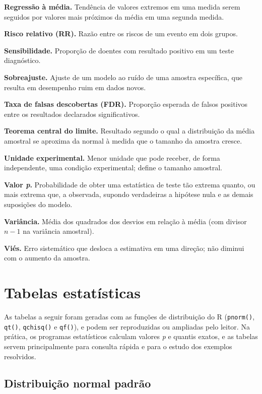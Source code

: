 \documentclass[
]{book}
\begin{document}
\textbf{Regressão à média.} Tendência de valores extremos em uma medida serem seguidos por valores mais próximos da média em uma segunda medida.

\textbf{Risco relativo (RR).} Razão entre os riscos de um evento em dois grupos.

\textbf{Sensibilidade.} Proporção de doentes com resultado positivo em um teste diagnóstico.

\textbf{Sobreajuste.} Ajuste de um modelo ao ruído de uma amostra específica, que resulta em desempenho ruim em dados novos.

\textbf{Taxa de falsas descobertas (FDR).} Proporção esperada de falsos positivos entre os resultados declarados significativos.

\textbf{Teorema central do limite.} Resultado segundo o qual a distribuição da média amostral se aproxima da normal à medida que o tamanho da amostra cresce.

\textbf{Unidade experimental.} Menor unidade que pode receber, de forma independente, uma condição experimental; define o tamanho amostral.

\textbf{Valor \emph{p}.} Probabilidade de obter uma estatística de teste tão extrema quanto, ou mais extrema que, a observada, supondo verdadeiras a hipótese nula e as demais suposições do modelo.

\textbf{Variância.} Média dos quadrados dos desvios em relação à média (com divisor \(n - 1\) na variância amostral).

\textbf{Viés.} Erro sistemático que desloca a estimativa em uma direção; não diminui com o aumento da amostra.

\section{Tabelas estatísticas}\label{tabelas-estatuxedsticas}

As tabelas a seguir foram geradas com as funções de distribuição do R (\texttt{pnorm()}, \texttt{qt()}, \texttt{qchisq()} e \texttt{qf()}), e podem ser reproduzidas ou ampliadas pelo leitor. Na prática, os programas estatísticos calculam valores \emph{p} e quantis exatos, e as tabelas servem principalmente para consulta rápida e para o estudo dos exemplos resolvidos.

\subsection{Distribuição normal padrão}\label{distribuiuxe7uxe3o-normal-padruxe3o}
\end{document}
